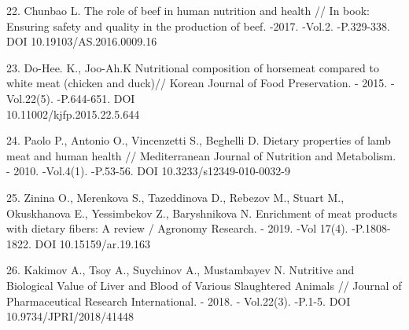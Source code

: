 \begin{references}
22. Chunbao L. The role of beef in human nutrition and health // In
book: Ensuring safety and quality in the production of beef. -2017.
-Vol.2. -P.329-338. DOI 10.19103/AS.2016.0009.16

23. Do-Hee. K., Joo-Ah.K Nutritional composition of horsemeat compared
to white meat (chicken and duck)// Korean Journal of Food Preservation.
- 2015. -Vol.22(5). -P.644-651. DOI \\10.11002/kjfp.2015.22.5.644

24. Paolo P., Antonio O., Vincenzetti S., Beghelli D. Dietary properties
of lamb meat and human health // Mediterranean Journal of Nutrition and
Metabolism. - 2010. -Vol.4(1). -P.53-56. DOI 10.3233/s12349-010-0032-9

25. Zinina O., Merenkova S., Tazeddinova D., Rebezov M., Stuart M.,
Okuskhanova E., Yessimbekov Z., Baryshnikova N. Enrichment of meat
products with dietary fibers: A review / Agronomy Research. - 2019. -Vol
17(4). -P.1808-1822. DOI 10.15159/ar.19.163

26. Kakimov A., Tsoy A., Suychinov A., Mustambayev N. Nutritive and
Biological Value of Liver and Blood of Various Slaughtered Animals //
Journal of Pharmaceutical Research International. - 2018. - Vol.22(3).
-P.1-5. DOI 10.9734/JPRI/2018/41448
\end{references}

